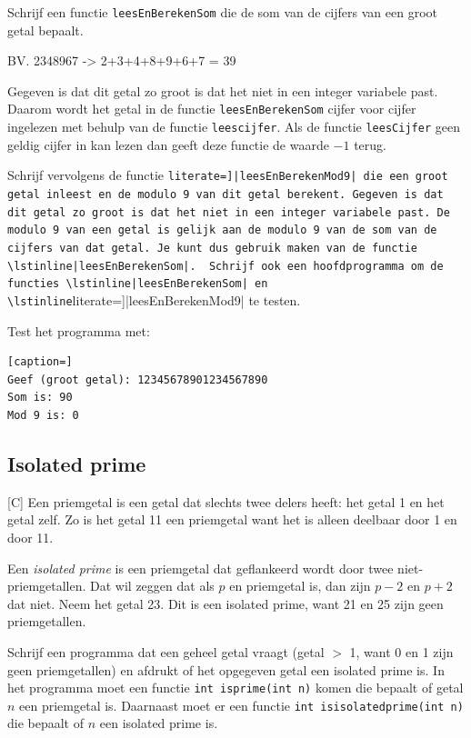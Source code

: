 \documentclass[a4paper,10pt,fleqn,twoside]{article}
\begin{document}
Schrijf een functie \lstinline|leesEnBerekenSom| die de som van de cijfers van een groot getal bepaalt. 

BV. 2348967 -> 2+3+4+8+9+6+7 = 39

Gegeven is dat dit getal zo groot is dat het niet in een integer variabele past. Daarom wordt het getal in de functie \lstinline|leesEnBerekenSom| cijfer voor cijfer ingelezen met behulp van de functie \lstinline|leescijfer|. Als de functie \lstinline|leesCijfer| geen geldig cijfer in kan lezen dan geeft deze functie de waarde $-1$ terug.

Schrijf vervolgens de functie \lstinline[literate=]|leesEnBerekenMod9| die een groot getal inleest en de modulo 9 van dit getal berekent. Gegeven is dat dit getal zo groot is dat het niet in een integer variabele past. De modulo 9 van een getal is gelijk aan de modulo 9 van de som van de cijfers van dat getal. Je kunt dus gebruik maken van de functie \lstinline|leesEnBerekenSom|.

Schrijf ook een hoofdprogramma om de functies \lstinline|leesEnBerekenSom| en \lstinline[literate=]|leesEnBerekenMod9| te testen.

Test het programma met:

\begin{lstlisting}[caption=]
Geef (groot getal): 12345678901234567890
Som is: 90
Mod 9 is: 0
\end{lstlisting}


\subsection{Isolated prime}[C]
Een priemgetal is een getal dat slechts twee delers heeft: het getal 1 en het getal zelf. Zo is het getal 11 een priemgetal want het is alleen deelbaar door 1 en door 11.

Een \textsl{isolated prime} is een priemgetal dat geflankeerd wordt door twee niet-priemgetallen. Dat wil zeggen dat als $p$ en priemgetal is, dan zijn $p-2$ en $p+2$ dat niet. Neem het getal 23. Dit is een isolated prime, want 21 en 25 zijn geen priemgetallen.

Schrijf een programma dat een geheel getal vraagt (getal $>$ 1, want 0 en 1 zijn geen priemgetallen) en afdrukt of het opgegeven getal een isolated prime is. In het programma moet een functie \lstinline|int isprime(int n)| komen die bepaalt of getal $n$ een priemgetal is. Daarnaast moet er een functie \lstinline|int isisolatedprime(int n)| die bepaalt of $n$ een isolated prime is.
\end{document}
